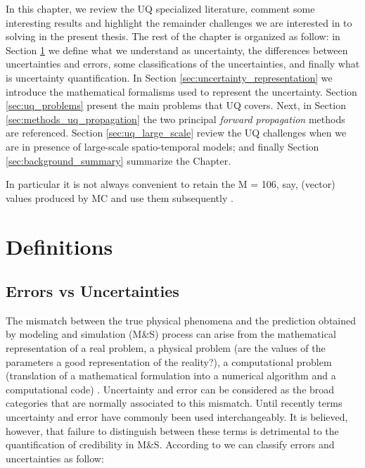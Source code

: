In this chapter, we review the UQ specialized literature, comment some interesting results and highlight the remainder challenges we are interested in to solving in the present thesis. The rest of the chapter is organized as follow: in Section \ref{sec:definitions} we define what we understand as uncertainty, the differences between uncertainties and errors, some classifications of the uncertainties, and finally what is uncertainty quantification. In Section \ref{sec:uncertainty_representation} we introduce the mathematical formalisms used to represent the uncertainty. Section \ref{sec:uq_problems} present the main problems that UQ covers. Next, in Section \ref{sec:methods_uq_propagation} the two principal \textit{forward propagation} methods are referenced. Section \ref{sec:uq_large_scale} review the UQ challenges when we are in presence of large-scale spatio-temporal models; and finally Section \ref{sec:background_summary} summarize the Chapter.

In particular it is not always convenient to retain the M = 106, say, (vector) values produced by MC and use them subsequently \cite{Cox2012}.

\section{Definitions}\label{sec:definitions}
\subsection{Errors vs Uncertainties}

The mismatch between the true physical phenomena and the prediction obtained by modeling and simulation (M\&S) process can arise from the mathematical representation of a real problem, a physical problem (are the values of the parameters a good representation of the reality?), a computational problem (translation of a mathematical formulation into a numerical algorithm and a computational code) \cite{Lavril2015}. Uncertainty and error can be considered as the broad categories  that  are  normally  associated to this mismatch. Until recently terms  uncertainty  and error  have  commonly  been  used  interchangeably.  It is believed, however, that failure to distinguish between these terms is detrimental to the quantification of credibility in M\&S. According to \cite{Alvin1998} we can classify errors and uncertainties as follow: 

